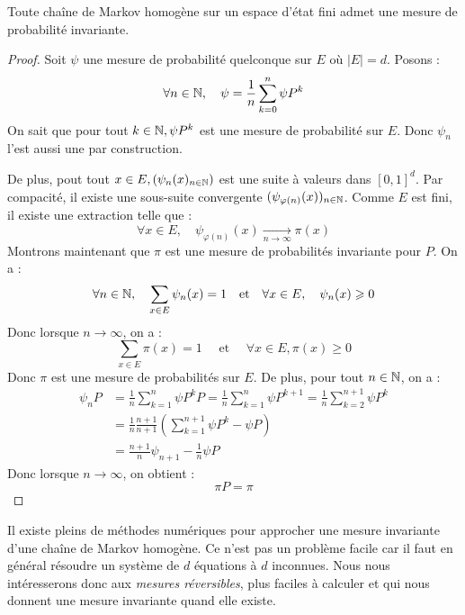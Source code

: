 \begin{theorem}
    Toute chaîne de Markov homogène sur un espace d'état fini admet une mesure de probabilité invariante. 
\end{theorem}

\begin{proof}
    Soit $ \psi$ une mesure de probabilité quelconque sur $E$ où $ |E| = d$. Posons : 
        $$ \forall n \in \mathbb{N}, \quad \psi = \frac{1}{n} \sum_{k=0}^{n} \psi P^k $$ 
    On sait que pour tout $k \in \mathbb{N}, \psi P^k$ est une mesure de probabilité sur $E$. Donc $ \psi_n$ l'est aussi 
    une par construction. 
    
    De plus, pout tout $x \in E, ( \psi_n(x)_{n \in \mathbb{N}})$ est une suite à valeurs dans $[0,1]^d$. Par compacité,
    il existe une sous-suite convergente $( \psi_{ \varphi(n)}(x))_{n \in \mathbb{N}}$. Comme $E$ est fini, il existe une 
    extraction telle que : 
        $$ \forall x \in E, \quad \psi_{ \varphi(n)}(x) \underset{n \to \infty}{\longrightarrow} \pi(x) $$
    Montrons maintenant que $ \pi$ est une mesure de probabilités invariante pour $P$. 
    On a : 
        $$ \forall n \in \mathbb{N}, \quad \sum_{x \in E} \psi_n(x) = 1 \quad \text{et} \quad \forall x \in E, \quad \psi_n(x) \geqslant 0 $$
    Donc lorsque $ n \to \infty$, on a :
        $$ \sum_{x \in E} \pi(x) = 1 \quad \text{ et } \quad \forall x \in E, \pi(x) \geqslant 0 $$
    Donc $ \pi$ est une mesure de probabilités sur $E$. De plus, pour tout $n \in \mathbb{N}$, on a : 
        \begin{align*}
            \psi_n P &= \frac{1}{n} \sum_{k=1}^{n} \psi P^k P =  \frac{1}{n} \sum_{k=1}^{n} \psi P^{k+1} = \frac{1}{n} \sum_{k=2}^{n+1} \psi P^k \\ 
            &= \frac{1}{n} \frac{n+1}{n+1} \left( \sum_{k=1}^{n+1} \psi P^k - \psi P \right) \\ 
            &= \frac{n+1}{n} \psi_{n+1} - \frac{1}{n} \psi P     
        \end{align*} 
    Donc lorsque $ n \to \infty$, on obtient : 
        $$ \pi P = \pi $$
\end{proof}

\begin{remark}
    Il existe pleins de méthodes numériques pour approcher une mesure invariante d'une chaîne de Markov homogène. 
    Ce n'est pas un problème facile car il faut en général résoudre un système de $d$ équations à $d$ inconnues. 
    Nous nous intéresserons donc aux \emph{mesures réversibles}, plus faciles à calculer et qui nous donnent 
    une mesure invariante quand elle existe. 
\end{remark}

